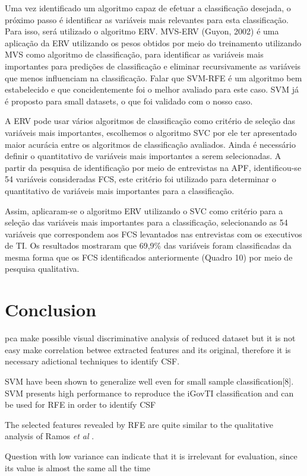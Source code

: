 Uma vez identificado um algoritmo capaz de efetuar a classificação desejada, o próximo passo é identificar as variáveis mais relevantes para esta classificação. Para isso, será utilizado o algoritmo ERV. 
MVS-ERV (Guyon, 2002) é uma aplicação da ERV utilizando os pesos obtidos por meio do treinamento utilizando MVS como algoritmo de classificação, para identificar as variáveis mais importantes para predições de classificação e eliminar recursivamente as variáveis que menos influenciam na classificação. Falar que SVM-RFE é um algoritmo bem estabelecido e que concidentemente foi o melhor avaliado para este caso. SVM já é proposto para small datasets, o que foi validado com o nosso caso.

A ERV pode usar vários algoritmos de classificação como critério de seleção das variáveis mais importantes, escolhemos o algoritmo SVC por ele ter apresentado maior acurácia entre os algoritmos de classificação avaliados. Ainda é necessário definir o quantitativo de variáveis mais importantes a serem selecionadas. A partir da pesquisa de identificação por meio de entrevistas na APF, identificou-se 54 variáveis consideradas FCS, este critério foi utilizado para determinar o quantitativo de variáveis mais importantes para a classificação.

Assim, aplicaram-se o algoritmo ERV utilizando o SVC como critério para a seleção das variáveis mais importantes para a classificação, selecionando as 54 variáveis que correspondem aos FCS levantados nas entrevistas com os executivos de TI. Os resultados mostraram que 69,9\% das variáveis foram classificadas da mesma forma que os FCS identificados anteriormente (Quadro 10) por meio de pesquisa qualitativa.

\section{Conclusion}
\label{sec:ch2_conclusion}

pca make possible visual discriminative analysis of reduced dataset but it is not easy make correlation betwee extracted features and its original, therefore it is necessary adictional techniques to identify CSF.

SVM have been shown to generalize well even for small sample classification[8]. SVM presents high performance to reproduce the iGovTI classification and can be used for RFE in order to identify CSF

The selected features revealed by RFE are quite similar to the qualitative analysis of Ramos \emph{et al} \cite{ramos2016information}.

Question with low variance can indicate that it is irrelevant for evaluation, since its value is almost the same all the time